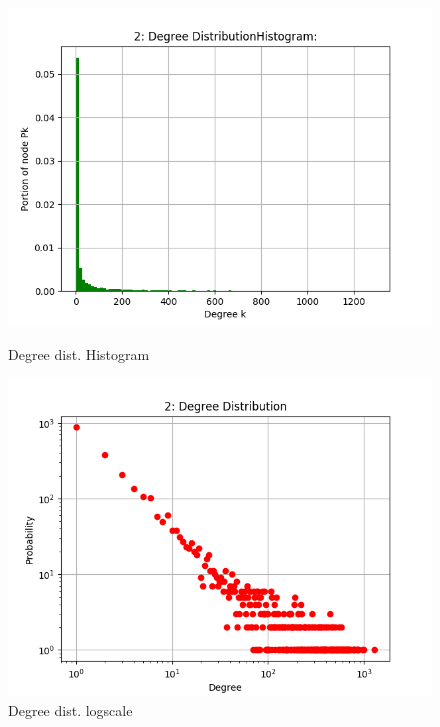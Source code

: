 \documentclass[runningheads]{llncs}
\begin{document}
 \begin{figure}
    \centering
    \begin{minipage}{0.5\textwidth}
        \centering
        \includegraphics[width=\textwidth]{2_Degree_dist_hist} %
        \caption{Degree dist. Histogram}
        \label{fig_2_Degree_dist_hist}
    \end{minipage}\hfill
    \begin{minipage}{0.5\textwidth}
        \centering
        \includegraphics[width=\textwidth]{2_Degree_dist_log} %
        \caption{Degree dist. logscale}
        \label{fig_2_Degree_dist_log}
    \end{minipage}
\end{figure}
 
\end{document}
